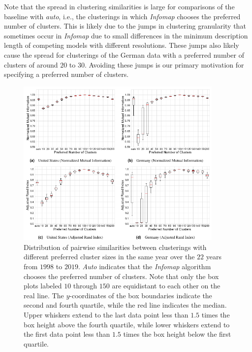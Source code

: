 \documentclass[utf8,sort&compress,numbers,square,table,hidelinks]{frontiers_suppmat} %
\begin{document}
Note that the spread in clustering similarities is large for comparisons of the baseline with \emph{auto}, i.e., the clusterings in which \emph{Infomap} chooses the preferred number of clusters.
This is likely due to the jumps in clustering granularity that sometimes occur in \emph{Infomap} due to small differences in the minimum description length of competing models with different resolutions. 
These jumps also likely cause the spread for clusterings of the German data with a preferred number of clusters of around $20$ to $30$.
Avoiding these jumps is our primary motivation for specifying a preferred number of clusters.


\begin{figure}
	\center
	\includegraphics[width=0.9\textwidth]{figure_si_preferred_number_of_clusters.pdf}
	\caption{Distribution of pairwise similarities between clusterings with different preferred cluster sizes in the same year over the $22$ years from $1998$ to $2019$. 
		\emph{Auto} indicates that the \emph{Infomap} algorithm chooses the preferred number of clusters.
		Note that only the box plots labeled $10$ through $150$ are equidistant to each other on the real line. 
		The $y$-coordinates of the box boundaries indicate the second and fourth quartile, while the red line indicates the median. 
		Upper whiskers extend to the last data point less than $1.5$ times the box height above the fourth quartile, 
		while lower whiskers extend to the first data point less than $1.5$ times the box height below the first quartile.
	}\label{fig:sensitivity-preferred-clusters}
\end{figure}
\end{document}
